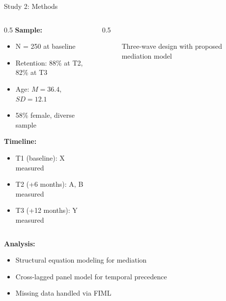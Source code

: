 \documentclass[aspectratio=169,12pt]{beamer}
\begin{document}
\begin{frame}{Study 2: Methods}
  \begin{columns}[T]
    
    \begin{column}{0.5\textwidth}
      \textbf{Sample:}
      \begin{itemize}
        \item N = 250 at baseline
        \item Retention: 88\% at T2, 82\% at T3
        \item Age: $M = 36.4$, $SD = 12.1$
        \item 58\% female, diverse sample
      \end{itemize}
      
      \vspace{0.5cm}
      
      \textbf{Timeline:}
      \begin{itemize}
        \item T1 (baseline): X measured
        \item T2 (+6 months): A, B measured
        \item T3 (+12 months): Y measured
      \end{itemize}
    \end{column}
    
    \begin{column}{0.5\textwidth}
      \begin{figure}
        \centering
        \caption{Three-wave design with proposed mediation model}
      \end{figure}
    \end{column}
    
  \end{columns}
  
  \vspace{0.5cm}
  
  \textbf{Analysis:}
  \begin{itemize}
    \item Structural equation modeling for mediation
    \item Cross-lagged panel model for temporal precedence
    \item Missing data handled via FIML
  \end{itemize}
\end{frame}
\end{document}
